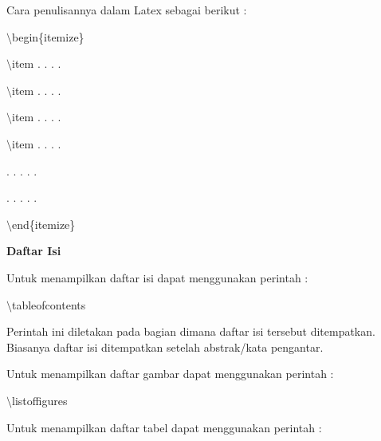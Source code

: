 Cara penulisannya dalam Latex sebagai berikut :\par \vspace{12pt}

$\setminus$begin\{itemize\}\par \vspace{12pt}

$\setminus$item . . . .\par \vspace{12pt}

$\setminus$item . . . .\par \vspace{12pt}

$\setminus$item . . . .\par \vspace{12pt}

$\setminus$item . . . .\par \vspace{12pt}

. . . . .

. . . . .\par \vspace{12pt}

$\setminus$end\{itemize\}\par \vspace{12pt}



\textbf{Daftar Isi}\par \vspace{12pt}

Untuk menampilkan daftar isi dapat menggunakan perintah :\par \vspace{12pt}

$\setminus$tableofcontents\par \vspace{12pt}

Perintah ini diletakan pada bagian dimana daftar isi tersebut 
ditempatkan. Biasanya daftar isi ditempatkan setelah abstrak/kata pengantar.

Untuk menampilkan daftar gambar dapat menggunakan perintah :\par \vspace{12pt}

$\setminus$listoffigures\par \vspace{12pt}

Untuk menampilkan daftar tabel dapat menggunakan perintah :\par \vspace{12pt}

